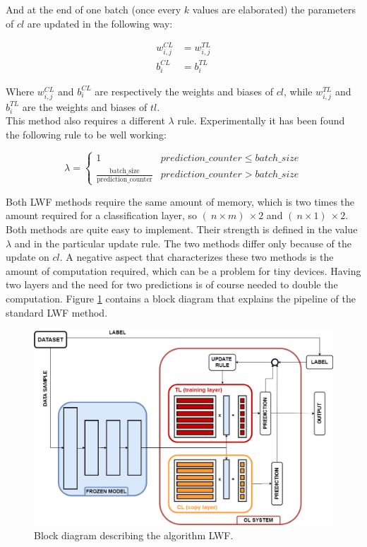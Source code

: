 \documentclass[12pt]{report}
\begin{document}
And at the end of one batch (once every $k$ values are elaborated) the parameters of $cl$ are updated in the following way:

\begin{align}
	w^{CL}_{i,j} &= w^{TL}_{i,j}  \\
	b^{CL}_i     &= b^{TL}_i  
\end{align}

Where $w^{CL}_{i,j}$ and $b^{CL}_i$ are respectively the weights and biases of $cl$, while $w^{TL}_{i,j}$ and $b^{TL}_i$ are the weights and biases of $tl$.\\
This method also requires a different $\lambda$ rule. Experimentally it has been found the following rule to be well working:

\begin{equation}
\lambda = \left\{
        		\begin{array}{ll}
            		1                                                         & prediction \_ counter \leq batch \_ size \\
            		\frac{\text{batch$\_$size}}{\text{prediction$\_$counter}} & prediction \_ counter >    batch \_ size
        		\end{array}
    		  \right.
\end{equation}

Both LWF methods require the same amount of memory, which is two times the amount required for a classification layer, so $(\ n \times m )\ \times 2$ and $(\ n \times 1 )\ \times 2$. Both methods are quite easy to implement. Their strength is defined in the value $\lambda$ and in the particular update rule. The two methods differ only because of the update on $cl$. A negative aspect that characterizes these two methods is the amount of computation required, which can be a problem for tiny devices. Having two layers and the need for two predictions is of course needed to double the computation. Figure \ref{fig:block_diag_LWF} contains a block diagram that explains the pipeline of the standard LWF method.  

\begin{figure}[h!]
    \centering
    \includegraphics[width=120mm]{Figures/Chapter3/LWF.png} 
    \caption{Block diagram describing the algorithm LWF.}
    \label{fig:block_diag_LWF}    
\end{figure}
\end{document}
